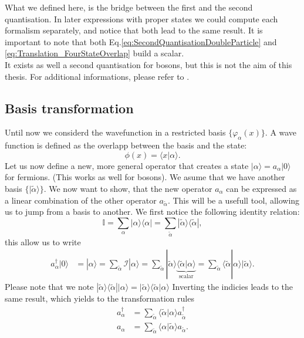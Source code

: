 \documentclass[../main.tex]{subfile}
\begin{document}
What we defined here, is the bridge between the first and the second quantisation. In later expressions with proper states we could compute each formalism separately, 
and notice that both lead to the same result. It is important to note that both Eq.\ref{eq:SecondQuantisationDoubleParticle} and \ref{eq:Translation_FourStateOverlap}
build a scalar.\\

It exists as well a second quantisation for bosons, but this is not the aim of this thesis. For additional informations, please refer to \cite{Folk2014}.

\subsection{Basis transformation}
Until now we considerd the wavefunction in a restricted basis $\{\varphi_{\alpha}(x)\}$. A wave function is defined as the overlapp between the basis and the state:
\[
    \phi(x) = \langle x | \alpha \rangle.
\]
Let us now define a new, more general operator that creates a state $|\alpha\rangle = a_{\alpha}|0\rangle$ for fermions. (This works as well for bosons).
We asume that we have another basis $\{|\tilde{\alpha}\rangle\}$.
We now want to show, that the new operator $a_{\alpha}$ can be expressed as a linear combination of the other operator  $a_{\tilde{\alpha}}$. This will be a
usefull tool, allowing us to jump from a basis to another. We first notice the following identity relation:
\[
    \mathbb{I} = \sum_{\alpha} | \alpha \rangle \langle \alpha| = \sum_{\tilde{\alpha}} | \tilde{\alpha} \rangle \langle \tilde{\alpha}|,
\]
this allow us to write 
\begin{align*}  
    a_{\alpha}^{\dagger}|0\rangle &= | \alpha \rangle =  \sum_{\tilde{\alpha}}\mathcal{I}|\alpha\rangle 
    =\sum_{\tilde{\alpha}}|\tilde{\alpha}\rangle\underbrace{\langle\tilde{\alpha}|\alpha\rangle}_{\text{scalar}} 
    = \sum_{\tilde{\alpha}}\langle\tilde{\alpha}|\alpha\rangle |\tilde{\alpha}\rangle.
\end{align*}
Please note that we note $|\tilde{\alpha}\rangle\langle\tilde{\alpha}||\alpha\rangle = |\tilde{\alpha}\rangle\langle\tilde{\alpha}|\alpha\rangle$
Inverting the indicies leads to the same result, which yields to the transformation rules
\begin{align*}
    a_{\alpha}^{\dagger} &= \sum_{\tilde{\alpha}}\langle\tilde{\alpha}|\alpha\rangle a_{\tilde{\alpha}}^{\dagger}\\
    a_{\alpha} &= \sum_{\tilde{\alpha}}\langle\alpha|\tilde{\alpha}\rangle a_{\tilde{\alpha}}.
\end{align*}
\end{document}
